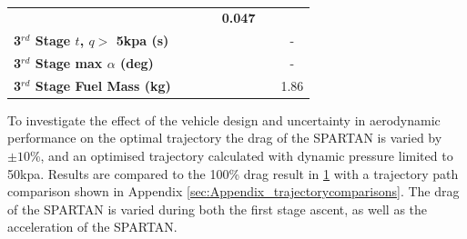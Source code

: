 \begin{table}[ht!]
\begin{tabular}{l c c c c c c}
		& \textbf{\thirddExergyEffCdStandardNoReturn}
		& \textbf{\thirddExergyEffCdOneHundredFiveNoReturn}
		& \textbf{\thirddExergyEffCdOneHundredTenNoReturn}
		& \textbf{0.047}
		\\
		\textbf{3$^{rd}$ Stage $t$, $q >$ 5kpa (s)}
		& \thirdqOverFiveCdNinetyNoReturn
		& \thirdqOverFiveCdNinetyFiveNoReturn
		& \thirdqOverFiveCdStandardNoReturn
		& \thirdqOverFiveCdOneHundredFiveNoReturn
		& \thirdqOverFiveCdOneHundredTenNoReturn
		& -
		\\
		\textbf{3$^{rd}$ Stage max $\alpha$ (deg)}
		& \thirdmaxAoACdNinetyNoReturn
		& \thirdmaxAoACdNinetyFiveNoReturn
		& \thirdmaxAoACdStandardNoReturn
		& \thirdmaxAoACdOneHundredFiveNoReturn
		& \thirdmaxAoACdOneHundredTenNoReturn
		& -
		\\
		\textbf{3$^{rd}$ Stage Fuel Mass (kg)}
		& \thirdmFuelCdNinetyNoReturn
		& \thirdmFuelCdNinetyFiveNoReturn
		& \thirdmFuelCdStandardNoReturn
		& \thirdmFuelCdOneHundredFiveNoReturn
		& \thirdmFuelCdOneHundredTenNoReturn
		&1.86
		\\
		\hline 
	\end{tabular} 
	\caption{}
	\label{tab:DragVariationNoReturn}
\end{table}

To investigate the effect of the vehicle design and uncertainty in aerodynamic performance on the optimal trajectory the drag of the SPARTAN is varied by $\pm10$\%, and an optimised trajectory calculated with dynamic pressure limited to 50kpa. Results are compared to the 100\% drag result in \ref{tab:DragVariationNoReturn} with a trajectory path comparison shown in Appendix \ref{sec:Appendix_trajectorycomparisons}. The drag of the SPARTAN is varied during both the first stage ascent, as well as the acceleration of the SPARTAN. 

